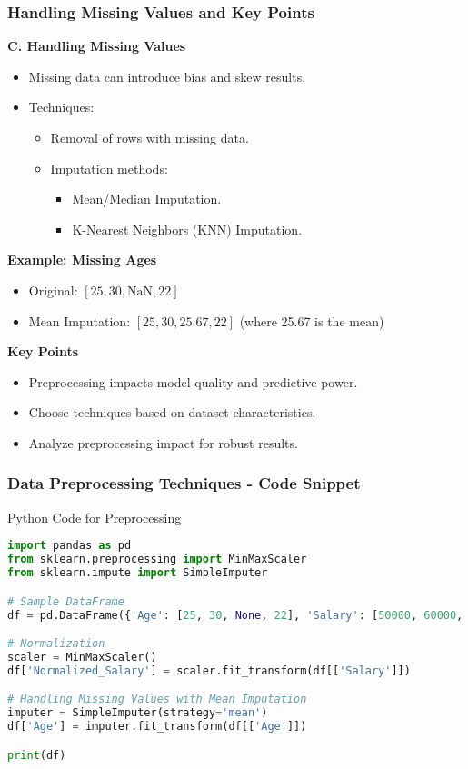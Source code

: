 \documentclass[aspectratio=169]{beamer}
\begin{document}
\begin{frame}[fragile]
  \frametitle{Handling Missing Values and Key Points}

  \textbf{C. Handling Missing Values}
  \begin{itemize}
    \item Missing data can introduce bias and skew results.
    \item Techniques:
    \begin{itemize}
      \item Removal of rows with missing data.
      \item Imputation methods:
      \begin{itemize}
        \item Mean/Median Imputation.
        \item K-Nearest Neighbors (KNN) Imputation.
      \end{itemize}
    \end{itemize}
  \end{itemize}

  \textbf{Example: Missing Ages}
  \begin{itemize}
    \item Original: \([25, 30, \text{NaN}, 22]\)
    \item Mean Imputation: \([25, 30, 25.67, 22]\) (where 25.67 is the mean)
  \end{itemize}

  \textbf{Key Points}
  \begin{itemize}
    \item Preprocessing impacts model quality and predictive power.
    \item Choose techniques based on dataset characteristics.
    \item Analyze preprocessing impact for robust results.
  \end{itemize}
\end{frame}

\begin{frame}[fragile]
  \frametitle{Data Preprocessing Techniques - Code Snippet}

  \begin{block}{Python Code for Preprocessing}
  \begin{lstlisting}[language=Python]
import pandas as pd
from sklearn.preprocessing import MinMaxScaler
from sklearn.impute import SimpleImputer

# Sample DataFrame
df = pd.DataFrame({'Age': [25, 30, None, 22], 'Salary': [50000, 60000, 70000, 80000]})

# Normalization
scaler = MinMaxScaler()
df['Normalized_Salary'] = scaler.fit_transform(df[['Salary']])

# Handling Missing Values with Mean Imputation
imputer = SimpleImputer(strategy='mean')
df['Age'] = imputer.fit_transform(df[['Age']])

print(df)
  \end{lstlisting}
  \end{block}

\end{frame}
\end{document}
